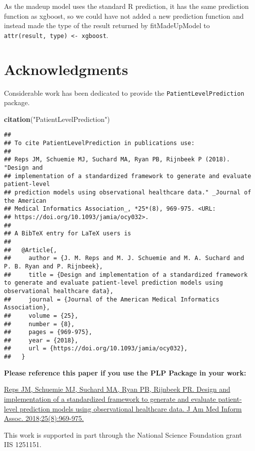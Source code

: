 \documentclass[
]{article}
\newenvironment{Shaded}{\begin{snugshade}}{\end{snugshade}}
\newcommand{\KeywordTok}[1]{\textcolor[rgb]{0.13,0.29,0.53}{\textbf{#1}}}
\newcommand{\NormalTok}[1]{#1}
\newcommand{\StringTok}[1]{\textcolor[rgb]{0.31,0.60,0.02}{#1}}
\begin{document}
As the madeup model uses the standard R prediction, it has the same
prediction function as xgboost, so we could have not added a new
prediction function and instead made the type of the result returned by
fitMadeUpModel to
\texttt{attr(result,\ \textquotesingle{}type\textquotesingle{})\ \textless{}-\ \textquotesingle{}xgboost\textquotesingle{}}.

\hypertarget{acknowledgments}{%
\section{Acknowledgments}\label{acknowledgments}}

Considerable work has been dedicated to provide the
\texttt{PatientLevelPrediction} package.

\begin{Shaded}
\begin{Highlighting}[]
\KeywordTok{citation}\NormalTok{(}\StringTok{"PatientLevelPrediction"}\NormalTok{)}
\end{Highlighting}
\end{Shaded}

\begin{verbatim}
## 
## To cite PatientLevelPrediction in publications use:
## 
## Reps JM, Schuemie MJ, Suchard MA, Ryan PB, Rijnbeek P (2018). "Design and
## implementation of a standardized framework to generate and evaluate patient-level
## prediction models using observational healthcare data." _Journal of the American
## Medical Informatics Association_, *25*(8), 969-975. <URL:
## https://doi.org/10.1093/jamia/ocy032>.
## 
## A BibTeX entry for LaTeX users is
## 
##   @Article{,
##     author = {J. M. Reps and M. J. Schuemie and M. A. Suchard and P. B. Ryan and P. Rijnbeek},
##     title = {Design and implementation of a standardized framework to generate and evaluate patient-level prediction models using observational healthcare data},
##     journal = {Journal of the American Medical Informatics Association},
##     volume = {25},
##     number = {8},
##     pages = {969-975},
##     year = {2018},
##     url = {https://doi.org/10.1093/jamia/ocy032},
##   }
\end{verbatim}

\textbf{Please reference this paper if you use the PLP Package in your
work:}

\href{http://dx.doi.org/10.1093/jamia/ocy032}{Reps JM, Schuemie MJ,
Suchard MA, Ryan PB, Rijnbeek PR. Design and implementation of a
standardized framework to generate and evaluate patient-level prediction
models using observational healthcare data. J Am Med Inform Assoc.
2018;25(8):969-975.}

This work is supported in part through the National Science Foundation
grant IIS 1251151.
\end{document}
